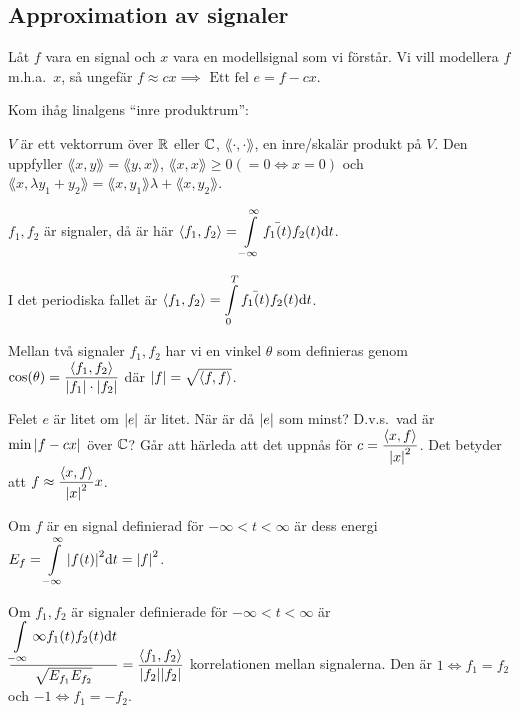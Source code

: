 \documentclass[a4paper]{article}
\begin{document}
\providecommand\fname{}
\renewcommand\fname{19-09-12}

\subsection{Approximation av signaler}
Låt \(
    f
\) vara en signal och \(
    x
\) vara en modellsignal som vi förstår. Vi vill modellera \(
    f
\) m.h.a.\ \(
    x
\), så ungefär \(
    f \approx cx \implies \text{ Ett fel } e = f - cx
\).

Kom ihåg linalgens \enquote{inre produktrum}:

\(
    V
\) är ett vektorrum över \(
    \mathbb{R}
\)  eller \(
    \mathbb{C}
\), \(
    \lang \cdot, \cdot \rang 
\), en inre/skalär produkt på \(
    V
\). Den uppfyller \(
    \lang x, y \rang = \lang y, x\rang 
\), \(
    \lang x, x \rang \geq 0 (= 0 \iff x = 0)
\) och \(
    \lang x, \lambda y_1+y_2 \rang = \lang x, y_1 \rang \lambda + \lang x, y_2 \rang
\).

\(
    f_1, f_2
\) är signaler, då är här \(
    \left\langle f_1, f_2 \right\rangle = \displaystyle\int\limits_{-\infty}^\infty \bar{f_1(t)} f_2(t) \dd t
\).

I det periodiska fallet är \(
    \left\langle f_1, f_2 \right\rangle = \displaystyle\int\limits_0^T \bar{f_1(t)} f_2(t) \dd t
\).

Mellan två signaler \(
    f_1, f_2
\) har vi en vinkel \(
    \theta
\) som definieras genom \(
    \cos(\theta) = \displaystyle\frac{\left\langle f_1, f_2 \right\rangle}{\abs{f_1} \cdot \abs{f_2}} 
\) där \(
    \abs{f} = \sqrt{\left\langle f, f \right\rangle}
\).

Felet \(
    e
\) är litet om \(
    \abs{e}
\) är litet. När är då \(
    \abs{e}
\) som minst? D.v.s.\ vad är \(
    \min{\abs{f-cx}}
\) över \(
    \mathbb{C}
\)? Går att härleda att det uppnås för \(
    c = \displaystyle\frac{\left\langle x, f \right\rangle}{\abs{x}^2} 
\). Det betyder att \(
    f \approx \displaystyle\frac{\left\langle x, f \right\rangle}{\abs{x}^2} x
\).


Om \(
    f
\) är en signal definierad för \(
    -\infty < t < \infty
\) är dess energi \(
    E_f = \displaystyle\int\limits_{-\infty}^{\infty} \abs{f(t)}^2 \dd t = \abs{f}^2
\).

Om \(
    f_1, f_2
\) är signaler definierade för \(
    -\infty < t < \infty
\) är \(
    \displaystyle\frac{
        \displaystyle\int\limits_{-\infty}{\infty} f_1(t) f_2(t) \dd t
    }{\sqrt{E_{f_1}E_{f_2}}} = \displaystyle\frac{\left\langle f_1, f_2 \right\rangle}{\abs{f_2}\abs{f_2}}  
\) korrelationen mellan signalerna. Den är \(
    1 \iff f_1 = f_2
\) och \(
    -1 \iff f_1 = -f_2
\).
\end{document}
